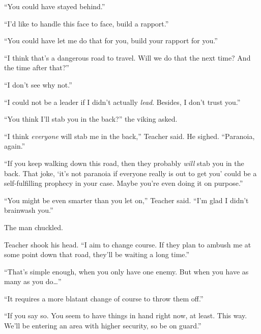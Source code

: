 ``You could have stayed behind.''



``I'd like to handle this face to face, build a rapport.''



``You could have let me do that for you, build your rapport for you.''



``I think that's a dangerous road to travel.  Will we do that the next time?  And the time after that?''



``I don't see why not.''



``I could not be a leader if I didn't actually \emph{lead}.  Besides, I don't trust you.''



``You think I'll stab you in the back?'' the viking asked.



``I think \emph{everyone} will stab me in the back,'' Teacher said.  He sighed.  ``Paranoia, again.''



``If you keep walking down this road, then they probably \emph{will} stab you in the back.  That joke, `it's not paranoia if everyone really is out to get you' could be a self-fulfilling prophecy in your case.  Maybe you're even doing it on purpose.''



``You might be even smarter than you let on,'' Teacher said.  ``I'm glad I didn't brainwash you.''



The man chuckled.



Teacher shook his head.  ``I aim to change course.  If they plan to ambush me at some point down that road, they'll be waiting a long time.''



``That's simple enough, when you only have one enemy.  But when you have as many as you do\ldots''



``It requires a more blatant change of course to throw them off.''



``If you say so.  You seem to have things in hand right now, at least.  This way.  We'll be entering an area with higher security, so be on guard.''



